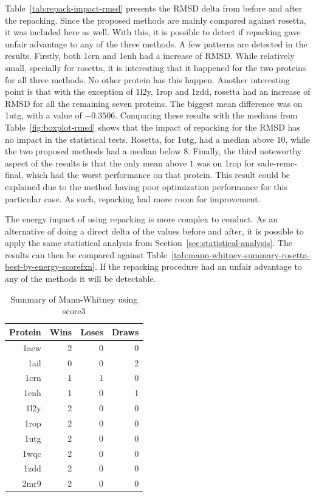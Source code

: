 Table~\ref{tab:repack-impact-rmsd} presents the RMSD delta from before and after
the repacking. Since the proposed methods are mainly compared against rosetta,
it was included here as well. With this, it is possible to detect if repacking
gave unfair advantage to any of the three methods. A few patterns are detected
in the results. Firstly, both 1crn and 1enh had a increase of RMSD. While
relatively small, specially for rosetta, it is interesting that it happened for
the two proteins for all three methods. No other protein has this happen.
Another interesting point is that with the exception of 1l2y, 1rop and 1zdd,
rosetta had an increase of RMSD for all the remaining seven proteins. The
biggest mean difference was on 1utg, with a value of $-0.3506$. Comparing these
results with the medians from Table~\ref{fig:boxplot-rmsd} shows that the
impact of repacking for the RMSD has no impact in the statistical tests. Rosetta,
for 1utg, had a median above $10$, while the two proposed methods had a median
below $8$. Finally, the third noteworthy aspect of the results is that the only
mean above $1$ was on 1rop for sade-remc-final, which had the worst performance
on that protein. This result could be explained due to the method having poor
optimization performance for this particular case. As such, repacking had more
room for improvement.

The energy impact of using repacking is more complex to conduct. As an
alternative of doing a direct delta of the values before and after, it is
possible to apply the same statistical analysis from
Section~\ref{sec:statistical-analysis}. The results can then be compared
against Table~\ref{tab:mann-whitney-summary-rosetta-best-by-energy-scorefxn}.
If the repacking procedure had an unfair advantage to any of the methods
it will be detectable.

\begin{table}
  \centering
  \begin{tabular}{r|r|r|r}
  Protein & Wins & Loses & Draws \\ \hline \hline
   1acw &  2 &  0 &  0 \\ \hline
   1ail &  0 &  0 &  2 \\ \hline
   1crn &  1 &  1 &  0 \\ \hline
   1enh &  1 &  0 &  1 \\ \hline
   1l2y &  2 &  0 &  0 \\ \hline
   1rop &  2 &  0 &  0 \\ \hline
   1utg &  2 &  0 &  0 \\ \hline
   1wqc &  2 &  0 &  0 \\ \hline
   1zdd &  2 &  0 &  0 \\ \hline
   2mr9 &  2 &  0 &  0 \\ \hline
  \end{tabular}
  \caption{Summary of Mann-Whitney using score3}
  \label{tab:mann-whitney-summary-best-by-energy-score3}
\end{table}

